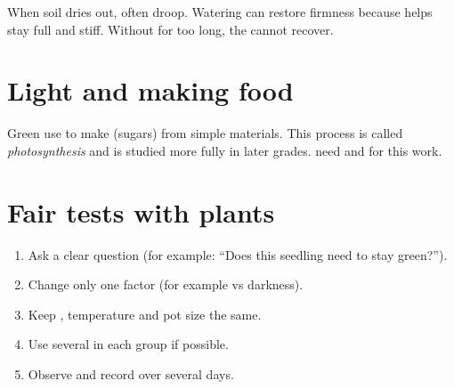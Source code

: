 \begin{example}\label{ex:g4:plants-need:wilt}
When soil dries out,  often droop. Watering can restore firmness
because  helps  stay full and stiff. Without  for too
long, the  cannot recover.
\end{example}

\section{Light and making food}

\begin{definition}\label{def:g4:plants-need:food}
Green  use   to make  (sugars) from simple
materials. This process is called
\emph{photosynthesis} and is studied more fully
in later grades.  need  and  for this work.
\end{definition}

\section{Fair tests with plants}

\begin{method}\label{met:g4:plants-need:test}
\begin{enumerate}
  \item Ask a clear question (for example: ``Does this seedling need
         to stay green?'').
  \item Change only one factor (for example  vs darkness).
  \item Keep , temperature and pot size the same.
  \item Use several  in each group if possible.
  \item Observe and record over several days.
\end{enumerate}
\end{method}

